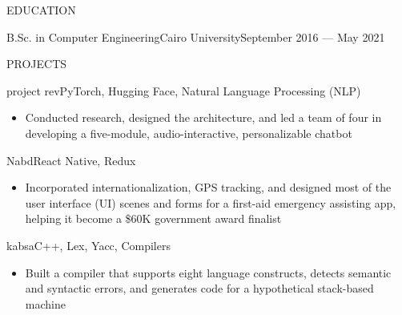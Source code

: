 \documentclass[]{mcdowellcv}
\begin{document}
	\begin{cvsection}{EDUCATION}
		\begin{cvsubsection}{B.Sc. in Computer Engineering}{Cairo University}{September 2016 — May 2021}\end{cvsubsection}
	\end{cvsection}
	\vspace*{-12pt}
	
	\begin{cvsection}{PROJECTS}
		\begin{cvsubsection}{project rev}{}{PyTorch, Hugging Face, Natural Language Processing (NLP)}
			\begin{itemize}
				\item Conducted research, designed the architecture, and led a team of four in developing a five-module, audio-interactive, personalizable chatbot
			\end{itemize}
		\end{cvsubsection}
		\begin{cvsubsection}{Nabd}{}{React Native, Redux}
			\begin{itemize}
				\item Incorporated internationalization, GPS tracking, and designed most of the user interface (UI) scenes and forms for a first-aid emergency assisting app, helping it become a \$60K government award finalist
			\end{itemize}
		\end{cvsubsection}
		\begin{cvsubsection}{kabsa}{}{C++, Lex, Yacc, Compilers}
			\begin{itemize}
				\item Built a compiler that supports eight language constructs, detects semantic and syntactic errors, and generates code for a hypothetical stack-based machine
			\end{itemize}
		\end{cvsubsection}
	\end{cvsection}
	
\end{document}
